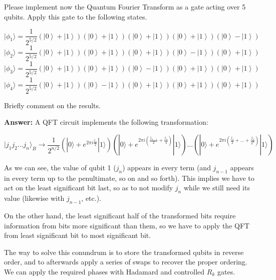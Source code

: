 \documentclass[11pt,dvipsnames]{article}
\begin{document}
{\color{teal}Please implement now the Quantum Fourier Transform as a gate acting over
5 qubits. Apply this gate to the following states.

\[ |\phi_1\rangle = \frac{1}{2^{5/2}}\left(\left|0\right\rangle+\left|1\right\rangle\right)\left(\left|0\right\rangle+\left|1\right\rangle\right)\left(\left|0\right\rangle+\left|1\right\rangle\right)\left(\left|0\right\rangle+\left|1\right\rangle\right)\left(\left|0\right\rangle-\left|1\right\rangle\right)\]
\[ |\phi_2\rangle = \frac{1}{2^{5/2}}\left(\left|0\right\rangle+\left|1\right\rangle\right)\left(\left|0\right\rangle+\left|1\right\rangle\right)\left(\left|0\right\rangle+\left|1\right\rangle\right)\left(\left|0\right\rangle-\left|1\right\rangle\right)\left(\left|0\right\rangle+\left|1\right\rangle\right)\]
\[ |\phi_3\rangle = \frac{1}{2^{5/2}}\left(\left|0\right\rangle+\left|1\right\rangle\right)\left(\left|0\right\rangle+\left|1\right\rangle\right)\left(\left|0\right\rangle-\left|1\right\rangle\right)\left(\left|0\right\rangle+\left|1\right\rangle\right)\left(\left|0\right\rangle+\left|1\right\rangle\right)\]
\[ |\phi_4\rangle = \frac{1}{2^{5/2}}\left(\left|0\right\rangle+\left|1\right\rangle\right)\left(\left|0\right\rangle-\left|1\right\rangle\right)\left(\left|0\right\rangle+\left|1\right\rangle\right)\left(\left|0\right\rangle+\left|1\right\rangle\right)\left(\left|0\right\rangle+\left|1\right\rangle\right)\]

Briefly comment on the results.}

\textbf{Answer:} A QFT circuit implements the following transformation:

\[
|j_1j_2...j_n\rangle_B\rightarrow \frac{1}{2^{n/2}}
\left(|0\rangle + e^{2\pi i \frac{j_n}{2}}|1\rangle \right) 
\left(|0\rangle + e^{2\pi i (\frac{j_{n-1}}{2}+\frac{j_n}{4})}|1\rangle \right)
... 
\left(|0\rangle + e^{2\pi i (\frac{j_1}{2}+...+\frac{j_n}{2^n})}|1\rangle \right) 
\]

As we can see, the value of qubit 1 (\(j_n\)) appears in every term (and
\(j_{n-1}\) appears in every term up to the penultimate, so on and so
forth). This implies we have to act on the least significant bit last,
so as to not modify \(j_n\) while we still need its value (likewise with
\(j_{n-1}\), etc.).

On the other hand, the least significant half of the transformed bits
require information from bits more significant than them, so we have to
apply the QFT from least significant bit to most significant bit.

The way to solve this conundrum is to store the transformed qubits in
reverse order, and to afterwards apply a series of swaps to recover the
proper ordering. We can apply the required phases with Hadamard and
controlled \(R_k\) gates.
\end{document}
